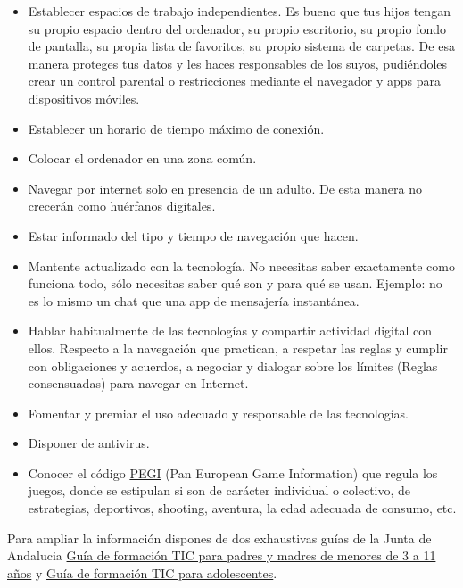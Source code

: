 \documentclass[
  a4paper,
  openany]{book}
\begin{document}
\begin{itemize}
\item
  Establecer espacios de trabajo independientes. Es bueno que tus hijos tengan su propio espacio dentro del ordenador, su propio escritorio, su propio fondo de pantalla, su propia lista de favoritos, su propio sistema de carpetas. De esa manera proteges tus datos y les haces responsables de los suyos, pudiéndoles crear un \href{https://securekids.es/que-es-el-control-parental-y-para-que-sirve/}{control parental} o restricciones mediante el navegador y apps para dispositivos móviles.
\item
  Establecer un horario de tiempo máximo de conexión.
\item
  Colocar el ordenador en una zona común.
\item
  Navegar por internet solo en presencia de un adulto. De esta manera no crecerán como huérfanos digitales.
\item
  Estar informado del tipo y tiempo de navegación que hacen.
\item
  Mantente actualizado con la tecnología. No necesitas saber exactamente como funciona todo, sólo necesitas saber qué son y para qué se usan. Ejemplo: no es lo mismo un chat que una app de mensajería instantánea.
\item
  Hablar habitualmente de las tecnologías y compartir actividad digital con ellos. Respecto a la navegación que practican, a respetar las reglas y cumplir con obligaciones y acuerdos, a negociar y dialogar sobre los límites (Reglas consensuadas) para navegar en Internet.
\item
  Fomentar y premiar el uso adecuado y responsable de las tecnologías.
\item
  Disponer de antivirus.
\item
  Conocer el código \href{https://pegi.info/es}{PEGI} (Pan European Game Information) que regula los juegos, donde se estipulan si son de carácter individual o colectivo, de estrategias, deportivos, shooting, aventura, la edad adecuada de consumo, etc.
\end{itemize}

Para ampliar la información dispones de dos exhaustivas guías de la Junta de Andalucia \href{https://www.andaluciaesdigital.es/documents/20182/28716/Educar+para+Proteger+-+Guía+resumida+de+formación+TIC+para+padres+y+madres+de+niños+de+3+a+11+años.pdf}{Guía de formación TIC para padres y madres de menores de 3 a 11 años} y \href{https://www.juntadeandalucia.es/educacion/portalaverroes/documents/10306/1673096/Educar_para_proteger_Guia_Adolescentes.pdf}{Guía de formación TIC para adolescentes}.
\end{document}
